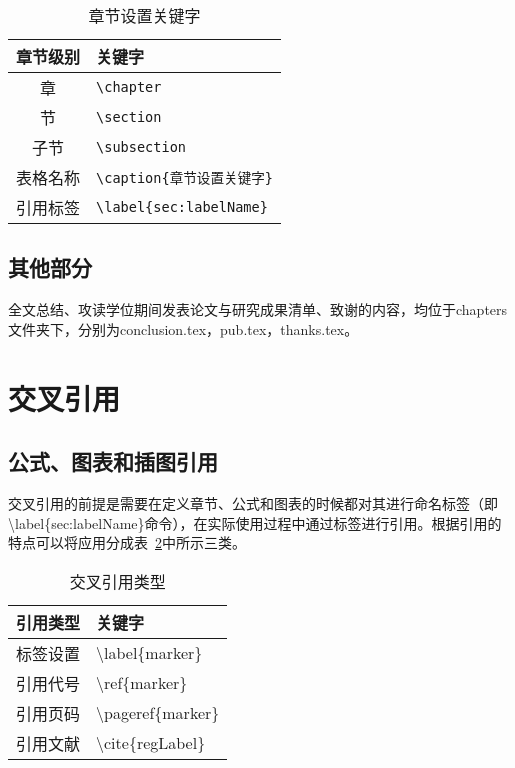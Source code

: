 \begin{table}[htb]
 \centering
  \caption{章节设置关键字}     %
  \label{tab:setSection}    %
  \begin{tabular}{cl}
    \hline
    章节级别        & 关键字     \\
    \hline
     章        & \verb|\chapter| \\
     节        & \verb|\section | \\
    子节      & \verb|\subsection |\\
    表格名称       & \verb|\caption{章节设置关键字}| \\
    引用标签       & \verb|\label{sec:labelName}| \\
    \hline
  \end{tabular}
\end{table}

\subsection{其他部分}


全文总结、攻读学位期间发表论文与研究成果清单、致谢的内容，均位于chapters文件夹下，分别为conclusion.tex，pub.tex，thanks.tex。

\section{交叉引用}
\subsection{公式、图表和插图引用}
\label{sec:refofFigAndTab}
交叉引用的前提是需要在定义章节、公式和图表的时候都对其进行命名标签（即\textbackslash label\{sec:labelName\}命令），在实际使用过程中通过标签进行引用。根据引用的特点可以将应用分成表~\ref{tab:citeType}中所示三类。

\begin{table}[htb]
 \centering
  \caption{交叉引用类型}       %
  \label{tab:citeType}    %
  \begin{tabular}{cl}
    \hline
    引用类型     & 关键字     \\
    \hline
    标签设置        & \textbackslash label\{marker\}  \\
    引用代号        & \textbackslash ref\{marker\}    \\
    引用页码        & \textbackslash pageref\{marker\} \\
    引用文献        & \textbackslash cite\{regLabel\} \\
    \hline
  \end{tabular}
\end{table}

